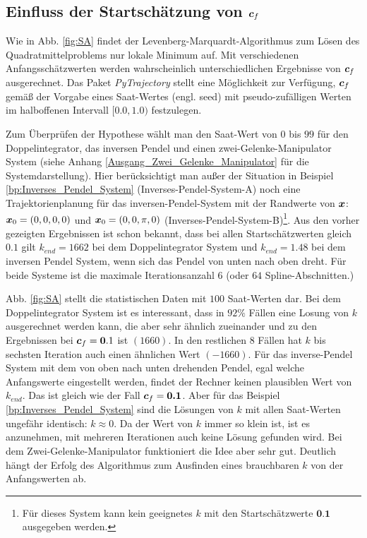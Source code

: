 \subsection{Einfluss der Startschätzung von $\boldsymbol c_{f}$}
\label{Einfluss_der_Startschätzung_von_cf}
Wie in Abb. \ref{fig:SA} findet der Levenberg-Marquardt-Algorithmus zum Lösen des Quadratmittelproblems nur lokale Minimum auf. Mit verschiedenen Anfangsschätzwerten werden wahrscheinlich unterschiedlichen Ergebnisse von $\boldsymbol c_{f}$ ausgerechnet. Das Paket \emph{PyTrajectory} stellt eine Möglichkeit zur Verfügung, $\boldsymbol c_{f}$ gemäß der Vorgabe eines Saat-Wertes (engl. seed) mit pseudo-zufälligen Werten im halboffenen Intervall $[0.0, 1.0)$ festzulegen.

Zum Überprüfen der Hypothese wählt man den Saat-Wert von $0$ bis $99$ für den Doppelintegrator, das inversen Pendel und einen zwei-Gelenke-Manipulator System (siehe Anhang \ref{Ausgang_Zwei_Gelenke_Manipulator} für die Systemdarstellung). Hier berücksichtigt man außer der Situation in Beispiel \ref{bp:Inverses_Pendel_System} (Inverses-Pendel-System-A) noch eine Trajektorienplanung für das inversen-Pendel-System mit der Randwerte von $\boldsymbol x$: $\boldsymbol x_{0}=(0,0,0,0)$ und $\boldsymbol x_{0}=(0,0,\pi,0)$ (Inverses-Pendel-System-B)\footnote{Für dieses System kann kein geeignetes $k$ mit den Startschätzwerte $\textbf{0.1}$ ausgegeben werden.}. Aus den vorher gezeigten Ergebnissen ist schon bekannt, dass bei allen Startschätzwerten gleich $0.1$ gilt $k_{end}=1662$ bei dem Doppelintegrator System und $k_{end}=1.48$ bei dem inversen Pendel System, wenn sich das Pendel von unten nach oben dreht. Für beide Systeme ist die maximale Iterationsanzahl $6$ (oder $64$ Spline-Abschnitten.)

Abb. \ref{fig:SA} stellt die statistischen Daten mit $100$ Saat-Werten dar. Bei dem Doppelintegrator System ist es interessant, dass in $92\%$ Fällen eine Losung von $k$ ausgerechnet werden kann, die aber sehr ähnlich zueinander und zu den Ergebnissen bei $\boldsymbol c_{f}=\boldsymbol 0.1$ ist $(1660)$. In den restlichen $8$ Fällen hat $k$ bis sechsten Iteration auch einen ähnlichen Wert $(-1660)$. Für das inverse-Pendel System mit dem von oben nach unten drehenden Pendel, egal welche Anfangswerte eingestellt werden, findet der Rechner keinen plausiblen Wert von $k_{end}$. Das ist gleich wie der Fall $\boldsymbol c_{f}=\textbf{0.1}$. Aber für das Beispiel \ref{bp:Inverses_Pendel_System} sind die Lösungen von $k$ mit allen Saat-Werten ungefähr identisch: $k \approx 0$. Da der Wert von $k$ immer so klein ist, ist es anzunehmen, mit mehreren Iterationen auch keine Lösung gefunden wird. Bei dem Zwei-Gelenke-Manipulator funktioniert die Idee aber sehr gut. Deutlich hängt der Erfolg des Algorithmus zum Ausfinden eines brauchbaren $k$ von der Anfangswerten ab.


